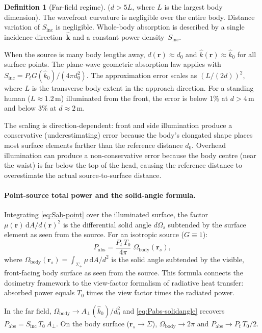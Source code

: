 \documentclass[11pt,a4paper]{article}
\theoremstyle{definition}      %
\newtheorem{definition}[definition]{Definition}
\newcommand{\khat}{\hat{\bm{k}}}
\newcommand{\rr}{\mathbf{r}}
\newcommand{\Sinc}{S_{\mathrm{inc}}}
\newcommand{\Aperp}{A_{\perp}}
\newcommand{\diff}{\mathrm{d}}        %
\begin{document}
\begin{definition}[Far-field regime]
($d > 5L$, where $L$ is the largest body dimension).  The wavefront
curvature is negligible over the entire body.  Distance variation of
$\Sinc$ is negligible.  Whole-body absorption is described by a single
incidence direction~$\khat$ and a constant power density~$\Sinc$.

When the source is many body lengths away, $d(\rr)\approx d_0$ and
$\hat{k}(\rr)\approx\hat{k}_0$ for all surface points.  The
plane-wave geometric absorption law applies with
$\Sinc = P_t G(\hat{k}_0)/(4\pi d_0^2)$.  The approximation error
scales as $(L/(2d))^2$, where $L$ is the transverse body extent in
the approach direction.  For a standing human ($L\approx 1.2$\,m)
illuminated from the front, the error is below 1\% at $d>4$\,m and
below 3\% at $d\approx 2$\,m.
\end{definition}

The scaling is direction-dependent: front and side illumination
produce a conservative (underestimating) error because the body's
elongated shape places most surface elements farther than the reference
distance $d_0$.  Overhead illumination can produce a non-conservative
error because the body centre (near the waist) is far below the
top of the head, causing the reference distance to overestimate the
actual source-to-surface distance.

\paragraph{Point-source total power and the solid-angle formula.}
Integrating \cref{eq:Sab-point} over the illuminated surface, the
factor $\mu(\rr)\,\diff A/d(\rr)^2$ is the differential solid angle
$d\Omega_s$ subtended by the surface element as seen from the source.
For an isotropic source ($G\equiv 1$):
\begin{equation}\label{eq:Pabs-solidangle}
  \boxed{P_{\mathrm{abs}}
    = \frac{P_t\,T_0}{4\pi}\;\Omega_{\mathrm{body}}(\rr_s),}
\end{equation}
where $\Omega_{\mathrm{body}}(\rr_s)
= \int_{\Sigma_+}\mu\,\diff A/d^2$ is the solid angle subtended by the
visible, front-facing body surface as seen from the source.
This formula connects the dosimetry framework to the view-factor
formalism of radiative heat transfer: absorbed power equals $T_0$
times the view factor times the radiated power.

In the far field, $\Omega_{\mathrm{body}}\to\Aperp(\hat{k}_0)/d_0^2$
and \cref{eq:Pabs-solidangle} recovers
$P_{\mathrm{abs}}=\Sinc\,T_0\,\Aperp$.  On the body surface
($\rr_s\to\Sigma$), $\Omega_{\mathrm{body}}\to 2\pi$ and
$P_{\mathrm{abs}}\to P_t\,T_0/2$.
\end{document}

